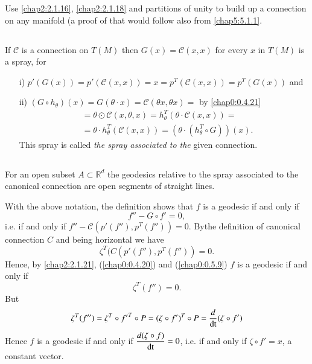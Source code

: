 \begin{exer*}
Use \ref{chap2:2.1.16}, \ref{chap2:2.1.18} and partitions of unity to build up
a connection on any manifold (a proof of that would follow also from
\ref{chap5:5.1.1}. 
\end{exer*}

\setcounter{subsection}{18}

\subsection{}\label{chap2:2.1.19}

\begin{remark*}
If $\mathcal{C}$ is a connection on $T(M)$ then
$G(x)=\mathcal{C}(x,x)$ for every $x$ in $T(M)$ is a spray, for
\begin{itemize}
\item[i)]
  $p'(G(x))=p'(\mathcal{C}(x,x))=x=p^{T}(\mathcal{C}(x,x))=p^{T}(G(x))$
  and

\item[ii)] $(G\circ h_{\theta})(x)=G(\theta\cdot x)=\mathcal{C}(\theta
  x,\theta x)=$ by \ref{chap0:0.4.21}
\begin{align*}
&= \theta\odot \mathcal{C}(x,\theta,x)=h^{T}_{\theta}(\theta\cdot
  \mathcal{C}(x,x))=\\
&= \theta\cdot h^{T}_{\theta}(\mathcal{C}(x,x))=(\theta\cdot
  (h^{T}_{\theta}\circ G))(x).
\end{align*}
This spray is called {\em the spray associated to the} given connection.
\end{itemize}
\end{remark*}

\subsection{}\label{chap2:2.1.20}

\begin{claim*}
For an open subset $A\subset \mathbb{R}^{d}$ the geodesics relative to
the spray associated to the canonical connection are open segments of
straight lines.
\end{claim*}

With the above notation, the definition shows that $f$ is a geodesic
if and only if
$$
f''-G\circ f'=0,
$$
i.e. if and only if
$f''-\mathcal{C}(p'(f''),p^{T}(f''))=0$. By\pageoriginale the
definition of canonical connection $C$ and being horizontal we have 
\begin{equation*}
\zeta^{T}(C(p'(f''),p^{T}(f''))=0.\tag{2.1.21}\label{chap2:2.1.21}
\end{equation*}
Hence, by \eqref{chap2:2.1.21}, (\ref{chap0:0.4.20}) and (\ref{chap0:0.5.9}) $f$
is a geodesic if and only if
\begin{equation*}
\zeta^{T}(f'')=0.\tag{2.1.22}\label{chap2:2.1.22}
\end{equation*}
But
$$
\zeta^{T}(f'')=\zeta^{T}\circ {f'}^{T}\circ P=(\zeta\circ f')^{T}\circ
P=\dfrac{d}{\operatorname{dt}}(\zeta\circ f')
$$
Hence $f$ is a geodesic if and only if $\dfrac{d(\zeta\circ
  f)}{\operatorname{dt}}=0$, i.e. if and only if $\zeta\circ f'=x$, a constant
vector.

